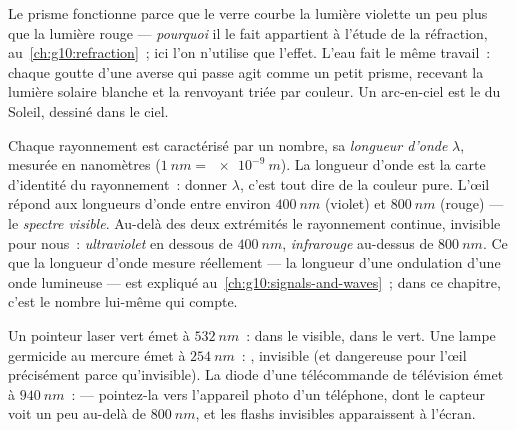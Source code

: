 \begin{remark}\label{rem:g10:light-spectra:rainbow}
Le prisme fonctionne parce que le verre courbe la lumière violette un
peu plus que la lumière rouge --- \emph{pourquoi} il le fait appartient
à l'étude de la réfraction, au~\cref{ch:g10:refraction}~; ici l'on
n'utilise que l'effet. L'eau fait le même travail~: chaque goutte d'une
averse qui passe agit comme un petit prisme, recevant la lumière solaire
blanche et la renvoyant triée par couleur. Un arc-en-ciel est le
 du Soleil, dessiné dans le ciel.
\end{remark}

\begin{definition}\label{def:g10:light-spectra:wavelength}
Chaque rayonnement  est caractérisé par un nombre, sa
\emph{longueur d'onde} $\lambda$, mesurée en
nanomètres ($\qty{1}{nm} = \qty{e-9}{m}$). La longueur d'onde est la
carte d'identité du rayonnement~: donner $\lambda$, c'est tout dire de
la couleur pure. L'œil répond aux longueurs d'onde entre environ
$\qty{400}{nm}$ (violet) et $\qty{800}{nm}$ (rouge) --- le
\emph{spectre visible}. Au-delà des deux
extrémités le rayonnement continue, invisible pour nous~:
\emph{ultraviolet} en dessous de $\qty{400}{nm}$,
\emph{infrarouge} au-dessus de $\qty{800}{nm}$. Ce
que la longueur d'onde mesure réellement --- la longueur d'une
ondulation d'une onde lumineuse --- est expliqué au~\cref{ch:g10:signals-and-waves}~; dans ce chapitre, c'est le
nombre lui-même qui compte.
\end{definition}

\begin{example}\label{ex:g10:light-spectra:classify}
Un pointeur laser vert émet à $\qty{532}{nm}$~: dans le visible, dans le
vert. Une lampe germicide au mercure émet à $\qty{254}{nm}$~:
, invisible (et dangereuse pour l'œil précisément parce
qu'invisible). La diode d'une télécommande de télévision émet à
$\qty{940}{nm}$~:  --- pointez-la vers l'appareil photo d'un
téléphone, dont le capteur voit un peu au-delà de $\qty{800}{nm}$, et
les flashs invisibles apparaissent à l'écran.
\end{example}

